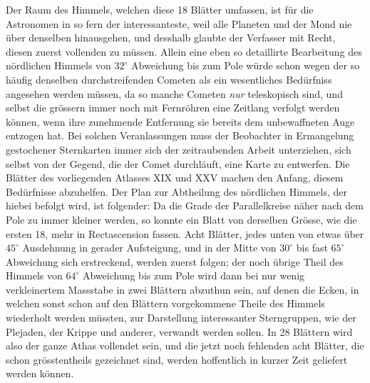 Der Raum des Himmels, welchen diese 18 Blätter umfassen, ist für die Astronomen in so fern der interessanteste, weil alle Planeten und der Mond nie über denselben hinausgehen, und desshalb glaubte der Verfasser mit Recht, diesen zuerst vollenden zu müssen. Allein eine eben so detaillirte Bearbeitung des nördlichen Himmels von $32^\circ$ Abweichung bis zum Pole würde schon wegen der so häufig denselben durchstreifenden Cometen als ein wesentliches Bedürfniss angesehen werden müssen, da so manche Cometen \emph{nur} teleskopisch sind, und selbst die grössern immer noch mit Fernröhren eine Zeitlang verfolgt werden können, wenn ihre zunehmende Entfernung sie bereits dem unbewaffneten Auge entzogen hat. Bei solchen Veranlassungen muss der Beobachter in Ermangelung gestochener Sternkarten immer sich der zeitraubenden Arbeit unterziehen, sich selbst von der Gegend, die der Comet durchläuft, eine Karte zu entwerfen. Die Blätter des vorliegenden Atlasses XIX und XXV machen den Anfang, diesem Bedürfnisse abzuhelfen. Der Plan zur Abtheilung des nördlichen Himmels, der hiebei befolgt wird, ist folgender: Da die Grade der Parallelkreise näher nach dem Pole zu immer kleiner werden, so konnte ein Blatt von derselben Grösse, wie die ersten 18, mehr in Rectascension fassen. Acht Blätter, jedes unten von etwas über $45^\circ$ Ausdehnung in gerader Aufsteigung, und in der Mitte von $30^\circ$ bis fast $65^\circ$ Abweichung sich erstreckend, werden zuerst folgen; der noch übrige Theil des Himmels von $64^\circ$ Abweichung bis zum Pole wird dann bei nur wenig verkleinertem Massstabe in zwei Blättern abzuthun sein, auf denen die Ecken, in welchen sonst schon auf den Blättern vorgekommene Theile des Himmels wiederholt werden müssten, zur Darstellung interessanter Sterngruppen, wie der Plejaden, der Krippe und anderer, verwandt werden sollen. In 28 Blättern wird also der ganze Athas vollendet sein, und die jetzt noch fehlenden acht Blätter, die schon grösstentheils gezeichnet sind, werden hoffentlich in kurzer Zeit geliefert werden können.

